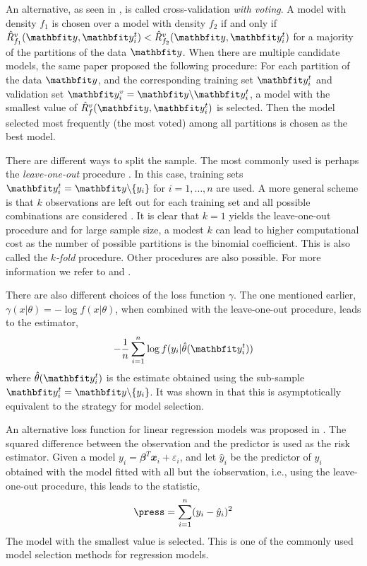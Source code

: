 An alternative, as seen in \cite{Yang:2007vx}, is called cross-validation \emph{with voting}. A model with density $f_1$ is chosen over a model with density $f_2$ if and only if $\hat{R}_{f_1}^v(\data,\data_i^t) < \hat{R}_{f_2}^v(\data,\data_i^t)$ for a majority of the partitions of the data $\data$. When there are multiple candidate models, the same paper proposed the following procedure: For each partition of the data $\data$, and the corresponding training set $\data_i^t$ and validation set $\data_i^v = \data\backslash\data_i^t$, a model with the smallest value of $\hat{R}_f^v(\data,\data_i^t)$ is selected. Then the model selected most frequently (the most voted) among all partitions is chosen as the best model.

There are different ways to split the sample. The most commonly used is perhaps the \emph{leave-one-out} procedure \cite{Stone:1974vx,Geisser:1975vx}. In this case, training sets $\data_i^t = \data\backslash\{y_i\}$ for $i = 1,\dots,n$ are used. A more general scheme is that $k$ observations are left out for each training set and all possible combinations are considered \cite{Shao:1993vx}. It is clear that $k=1$ yields the leave-one-out procedure and for large sample size, a modest $k$ can lead to higher computational cost as the number of possible partitions is the binomial coefficient. This is also called the $k$\emph{-fold} procedure. Other procedures are also possible. For more information we refer to \cite{Stone:1978vx} and \cite{Hjorth:1994vx}.

There are also different choices of the loss function $\gamma$. The one mentioned earlier, $\gamma(x|\theta) = -\log f(x|\theta)$, when combined with the leave-one-out procedure, leads to the estimator,
\begin{equation}
  -\frac{1}{n}\sum_{i=1}^n\log f(y_i|\hat\theta(\data_i^t))
\end{equation}
where $\hat\theta(\data_i^t)$ is the estimate obtained using the sub-sample $\data_i^t = \data\backslash\{y_i\}$. It was shown in \cite{Stone:1978vx} that this is asymptotically equivalent to the \aic strategy for model selection.

An alternative loss function for linear regression models was proposed in \cite{Allen:1974vx}. The squared difference between the observation and the predictor is used as the risk estimator. Given a model $y_i = \mathbfit{\beta}^T \mathbfit{x}_i + \varepsilon_i$, and let $\hat{y}_i$ be the predictor of $y_i$ obtained with the model fitted with all but the $i$\xth observation, i.e., using the leave-one-out procedure, this leads to the \press statistic,
\begin{equation}
  \press = \sum_{i=1}^n(y_i - \hat{y}_i)^2
\end{equation}
The model with the smallest \press value is selected. This is one of the commonly used model selection methods for regression models.

